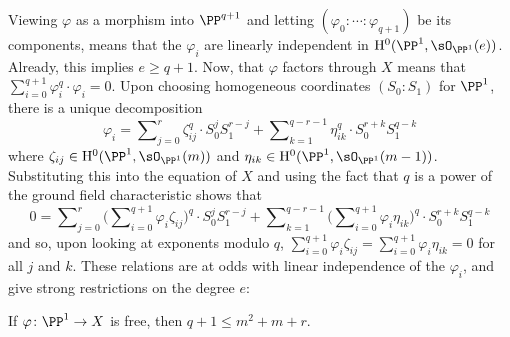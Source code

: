\begin{Remark}\label{frobenius-decomposition}
Viewing \(\varphi\) as a morphism into \(\PP^{q+1}\) and letting
\((\varphi_0: \cdots :\varphi_{q+1})\) be its components,
 means that the \(\varphi_i\) are linearly independent in
\(\mathrm{H}^0(\PP^1,\sO_{\PP^1}(e))\). Already, this implies \(e \geq q+1\).
Now, that \(\varphi\) factors through \(X\) means that
\(\sum_{i = 0}^{q+1} \varphi_i^q \cdot \varphi_i = 0\). Upon choosing homogeneous
coordinates \((S_0:S_1)\) for \(\PP^1\), there is a unique decomposition
\[
\varphi_i =
\sum\nolimits_{j = 0}^r \zeta_{ij}^q \cdot S_0^j S_1^{r-j} +
\sum\nolimits_{k = 1}^{q-r-1} \eta_{ik}^q \cdot S_0^{r+k} S_1^{q-k}
\]
where \(\zeta_{ij} \in \mathrm{H}^0(\PP^1, \sO_{\PP^1}(m))\) and
\(\eta_{ik} \in \mathrm{H}^0(\PP^1, \sO_{\PP^1}(m-1))\). Substituting this into
the equation of \(X\) and using the fact that \(q\) is a power of the ground
field characteristic shows that
\[
0 =
\sum\nolimits_{j = 0}^r \Big(\sum\nolimits_{i = 0}^{q+1} \varphi_i \zeta_{ij}\Big)^q \cdot S_0^j S_1^{r-j} +
\sum\nolimits_{k = 1}^{q-r-1} \Big(\sum\nolimits_{i = 0}^{q+1} \varphi_i \eta_{ik}\Big)^q \cdot S_0^{r+k} S_1^{q-k}
\]
and so, upon looking at exponents modulo \(q\),
\(\sum_{i = 0}^{q+1} \varphi_i\zeta_{ij} = \sum_{i = 0}^{q+1} \varphi_i \eta_{ik} = 0\) for all \(j\) and \(k\). These
relations are at odds with linear independence of the \(\varphi_i\), and give
strong restrictions on the degree \(e\):
\end{Remark}

\begin{Theorem}\label{free-bound}
If \(\varphi \colon \PP^1 \to X\) is free, then \(q+1 \leq m^2 + m + r\).
\end{Theorem}

